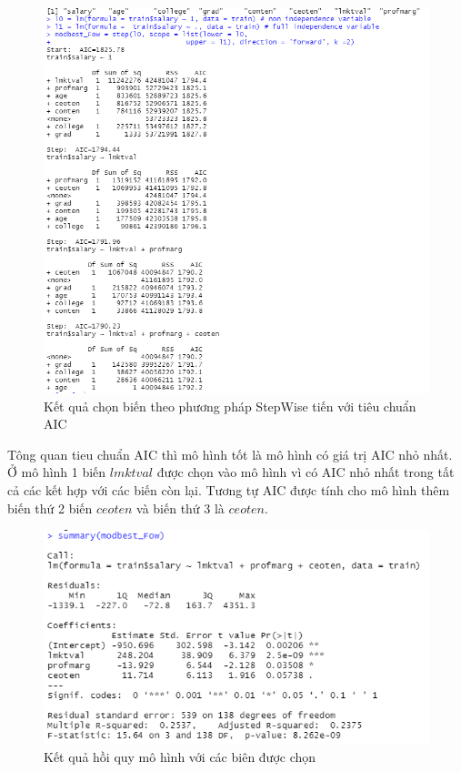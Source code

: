 \documentclass[a4paper]{article}
\begin{document}
\begin{figure}[h!]
	\centering
	\includegraphics[scale = 0.52]{../Photo Of Result/B1_stepwiseForward.PNG}  
	\caption{Kết quả chọn biến theo phương pháp StepWise tiến với tiêu chuẩn AIC}
	\label{ex1:model:1}
\end{figure}

Tông quan tieu chuẩn AIC thì mô hình tốt là mô hình có giá trị AIC nhỏ nhất. Ở mô hình 1 biến $\textit{lmktval}$ được chọn vào mô hình vì có AIC nhỏ nhất trong tất cả các kết hợp với các biến còn lại. Tương tự AIC được tính cho mô hình thêm biến thứ 2 biến $\textit{ceoten}$ và biến thứ 3 là $\textit{ceoten}$. 

\begin{figure}[h!]
	\centering
	\includegraphics[scale = 0.52]{../Photo Of Result/B1_summary.PNG}  
	\caption{Kết quả hồi quy mô hình với các biên được chọn}
	\label{ex1:model:1}
\end{figure}
\end{document}
